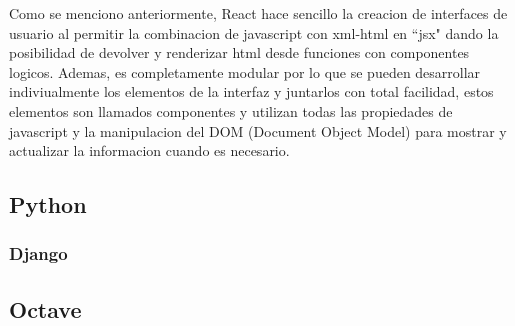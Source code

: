 Como se menciono anteriormente, React hace sencillo la creacion de interfaces
de usuario al permitir la combinacion de javascript con xml-html en ``jsx" dando
la posibilidad de devolver y renderizar html desde funciones con componentes
logicos. Ademas, es completamente modular por lo que se pueden desarrollar
indiviualmente los elementos de la interfaz y juntarlos con total facilidad,
estos elementos son llamados componentes y utilizan todas las propiedades de
javascript y la manipulacion del DOM (Document Object Model) para mostrar
y actualizar la informacion cuando es necesario.



\subsection{Python}
\subsubsection{Django}


\subsection{Octave}

